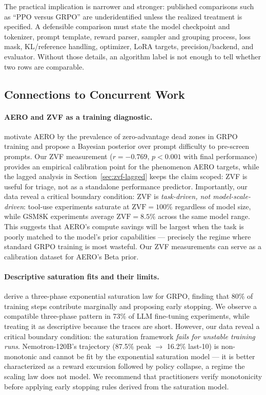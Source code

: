 The practical implication is narrower and stronger: published comparisons
such as ``PPO versus GRPO'' are underidentified unless the realized treatment
is specified.  A defensible comparison must state the model checkpoint and
tokenizer, prompt template, reward parser, sampler and grouping process, loss
mask, KL/reference handling, optimizer, LoRA targets, precision/backend, and
evaluator.  Without those details, an algorithm label is not enough to tell
whether two rows are comparable.

\subsection{Connections to Concurrent Work}
\label{sec:discuss_related}

\paragraph{AERO and ZVF as a training diagnostic.}
\citet{zhang2026aero} motivate AERO by the prevalence of zero-advantage dead
zones in GRPO training and propose a Bayesian posterior over prompt difficulty
to pre-screen prompts.
Our ZVF measurement ($r = -0.769$, $p < 0.001$ with final performance) provides
an empirical calibration point for the phenomenon AERO targets, while the
lagged analysis in Section~\ref{sec:zvf-lagged} keeps the claim scoped:
ZVF is useful for triage, not as a standalone performance predictor.
Importantly, our data reveal a critical boundary condition: ZVF is \emph{task-driven, not model-scale-driven}:
tool-use experiments saturate at $\text{ZVF} = 100\%$ regardless of model size,
while GSM8K experiments average $\text{ZVF} = 8.5\%$ across the same model
range.
This suggests that AERO's compute savings will be largest when the task is
poorly matched to the model's prior capabilities --- precisely the
regime where standard GRPO training is most wasteful.
Our ZVF measurements can serve as a calibration dataset for AERO's Beta prior.

\paragraph{Descriptive saturation fits and their limits.}
\citet{nimmaturi2025scalinglaws} derive a three-phase exponential saturation
law for GRPO, finding that 80\% of training steps contribute marginally and
proposing early stopping.
We observe a compatible three-phase pattern in 73\% of LLM fine-tuning
experiments, while treating it as descriptive because the traces are short.
However, our data reveal a critical boundary condition: the saturation
framework \emph{fails for unstable training runs}.
Nemotron-120B's trajectory (87.5\% peak $\to$ 16.2\% last-10) is
non-monotonic and cannot be fit by the exponential saturation model ---
it is better characterized as a reward excursion followed by policy
collapse, a regime the scaling law does not model.
We recommend that practitioners verify monotonicity before applying early
stopping rules derived from the saturation model.

